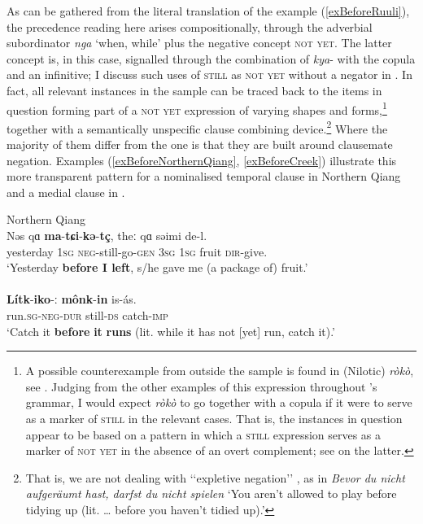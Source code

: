 As can be gathered from the literal translation of the  example (\ref{exBeforeRuuli}), the precedence reading here arises compositionally, through the adverbial subordinator \textit{nga} \lq when, while\rq{ }plus the negative concept \textsc{not yet}. The latter concept is, in this case, signalled through the combination of \mbox{\textit{kya}-} with the copula and an infinitive; I discuss such uses of \textsc{still} as \textsc{not yet} without a negator in . In fact, all relevant instances in the sample can be traced back to the items in question forming part of a \textsc{not yet} expression of varying shapes and forms,\footnote{A possible counterexample from outside the sample is found in  (Nilotic) \textit{ròkò}, see \textcite[360]{Dimmendaal1983}. Judging from the other examples of this expression throughout \citeauthor{Dimmendaal1983}'s grammar, I would expect \textit{ròkò} to go together with a copula if it were to serve as a marker of \textsc{still} in the relevant cases. That is, the instances in question appear to be based on a pattern in which a \textsc{still} expression serves as a marker of \textsc{not yet} in the absence of an overt complement; see  on the latter.} together with a semantically unspecific clause combining device.\footnote{That is, we are not dealing with \lq\lq{}expletive negation\rq\rq{ }\parencite{JinKoenig2021}, as in  
\textit{Bevor du nicht aufgeräumt hast, darfst du nicht spielen} \lq You aren't allowed to play before tidying up (lit. … before you haven't tidied up).'} Where the majority of them differ from the  one is that they are built around clausemate negation. Examples (\ref{exBeforeNorthernQiang}, \ref{exBeforeCreek}) illustrate this more transparent pattern for a nominalised temporal clause in Northern Qiang and a medial clause in .

\begin{exe}
	\ex Northern Qiang\label{exBeforeNorthernQiang}\\
	\gll Nəs qɑ \textbf{ma}-\textbf{tɕi}-\textbf{kə}-\textbf{tç}, theː qɑ səimi de-l.\\
	yesterday 1\textsc{sg} \textsc{neg}-still-go-\textsc{gen} 3\textsc{sg} 1\textsc{sg} fruit \textsc{dir}-give.\\
	\glt \lq Yesterday \textbf{before I left}, s/he gave me (a package of) fruit.'\\\parencite[241]		{LaPollaHuang2003}
	\ex {}\label{exBeforeCreek}\\
	\gll \textbf{Lítk}-\textbf{iko}-\textbf{ː} \textbf{mônk}-\textbf{in} is-ás.\\
	run.\textsc{sg}-\textsc{neg}-\textsc{dur} still-\textsc{ds} catch-\textsc{imp}\\
	\glt \lq Catch it \textbf{before} \textbf{it} \textbf{runs} (lit. while it has not [yet] run, catch it).\rq{}
	\\\parencite[404]{Martin2011}
\end{exe}

